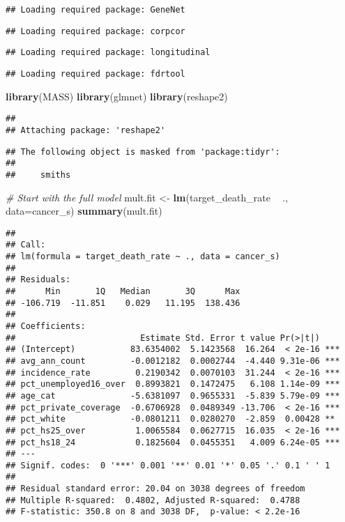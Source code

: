 \documentclass[]{article}
\newenvironment{Shaded}{\begin{snugshade}}{\end{snugshade}}
\newcommand{\KeywordTok}[1]{\textcolor[rgb]{0.13,0.29,0.53}{\textbf{#1}}}
\newcommand{\DataTypeTok}[1]{\textcolor[rgb]{0.13,0.29,0.53}{#1}}
\newcommand{\StringTok}[1]{\textcolor[rgb]{0.31,0.60,0.02}{#1}}
\newcommand{\CommentTok}[1]{\textcolor[rgb]{0.56,0.35,0.01}{\textit{#1}}}
\newcommand{\OperatorTok}[1]{\textcolor[rgb]{0.81,0.36,0.00}{\textbf{#1}}}
\newcommand{\NormalTok}[1]{#1}
\begin{document}
\begin{verbatim}
## Loading required package: GeneNet
\end{verbatim}

\begin{verbatim}
## Loading required package: corpcor
\end{verbatim}

\begin{verbatim}
## Loading required package: longitudinal
\end{verbatim}

\begin{verbatim}
## Loading required package: fdrtool
\end{verbatim}

\begin{Shaded}
\begin{Highlighting}[]
\KeywordTok{library}\NormalTok{(MASS)}
\KeywordTok{library}\NormalTok{(glmnet)}
\KeywordTok{library}\NormalTok{(reshape2)}
\end{Highlighting}
\end{Shaded}

\begin{verbatim}
## 
## Attaching package: 'reshape2'
\end{verbatim}

\begin{verbatim}
## The following object is masked from 'package:tidyr':
## 
##     smiths
\end{verbatim}

\begin{Shaded}
\begin{Highlighting}[]
\CommentTok{# Start with the full model}
\NormalTok{mult.fit <-}\StringTok{ }\KeywordTok{lm}\NormalTok{(target_death_rate }\OperatorTok{~}\StringTok{ }\NormalTok{., }\DataTypeTok{data=}\NormalTok{cancer_s)}
\KeywordTok{summary}\NormalTok{(mult.fit)}
\end{Highlighting}
\end{Shaded}

\begin{verbatim}
## 
## Call:
## lm(formula = target_death_rate ~ ., data = cancer_s)
## 
## Residuals:
##      Min       1Q   Median       3Q      Max 
## -106.719  -11.851    0.029   11.195  138.436 
## 
## Coefficients:
##                         Estimate Std. Error t value Pr(>|t|)    
## (Intercept)           83.6354002  5.1423568  16.264  < 2e-16 ***
## avg_ann_count         -0.0012182  0.0002744  -4.440 9.31e-06 ***
## incidence_rate         0.2190342  0.0070103  31.244  < 2e-16 ***
## pct_unemployed16_over  0.8993821  0.1472475   6.108 1.14e-09 ***
## age_cat               -5.6381097  0.9655331  -5.839 5.79e-09 ***
## pct_private_coverage  -0.6706928  0.0489349 -13.706  < 2e-16 ***
## pct_white             -0.0801211  0.0280270  -2.859  0.00428 ** 
## pct_hs25_over          1.0065584  0.0627715  16.035  < 2e-16 ***
## pct_hs18_24            0.1825604  0.0455351   4.009 6.24e-05 ***
## ---
## Signif. codes:  0 '***' 0.001 '**' 0.01 '*' 0.05 '.' 0.1 ' ' 1
## 
## Residual standard error: 20.04 on 3038 degrees of freedom
## Multiple R-squared:  0.4802, Adjusted R-squared:  0.4788 
## F-statistic: 350.8 on 8 and 3038 DF,  p-value: < 2.2e-16
\end{verbatim}
\end{document}
